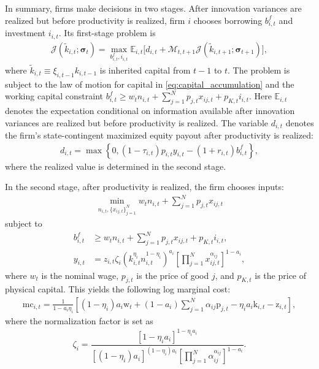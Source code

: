 \documentclass[12pt]{article}
\numberwithin{equation}{section}
\begin{document}
In summary, firms make decisions in two stages. After innovation variances are realized but before productivity is realized, firm $i$ chooses borrowing $b^f_{i,t}$ and investment $i_{i,t}$. Its first-stage problem is
\begin{align}\label{eq:firm_first_stage_decision}
    \mathcal{J}
    \left(\tilde{k}_{i,t}; \boldsymbol\sigma_t\right)
    =
    \max_{b^f_{i,t}, i_{i,t}}
    \mathbb{E}_{i,t}
    \Bigg[
            d_{i,t}
            +
            \mathcal{M}_{t,t+1}
            \mathcal{J}\left(\tilde{k}_{i,t+1}; \boldsymbol\sigma_{t+1}\right)
    \Bigg],
\end{align}
where $\tilde{k}_{i,t} \equiv \xi_{i,t-1}k_{i,t-1}$ is inherited capital from $t-1$ to $t$. The problem is subject to the law of motion for capital in \eqref{eq:capital_accumulation} and the working capital constraint $b^f_{i,t} \geq w_t n_{i,t} + \sum_{j=1}^{N} p_{j,t} x_{ij,t} + p_{K,t} i_{i,t}$. Here $\mathbb{E}_{i,t}$ denotes the expectation conditional on information available after innovation variances are realized but before productivity is realized. The variable $d_{i,t}$ denotes the firm's state-contingent maximized equity payout after productivity is realized:
\begin{align*}
    d_{i,t}
    =
    \max\left\{
        0,
        (1-\tau_{i,t})p_{i,t} y_{i,t}
        -
        (1+r_{i,t})b^f_{i,t}
    \right\},
\end{align*}
where the realized value is determined in the second stage.

In the second stage, after productivity is realized, the firm chooses inputs:
\begin{align}\label{eq:firm_second_stage_decision}
    \min_{n_{i,t},\{x_{ij,t}\}_{j=1}^{N}}
    w_t n_{i,t}
    + \sum_{j=1}^{N} p_{j,t} x_{ij,t}
\end{align}
subject to
\begin{align*}
    b^f_{i,t} &\geq w_t n_{i,t}
    + \sum_{j=1}^{N} p_{j,t} x_{ij,t}
    + p_{K,t} i_{i,t},
    \\
    y_{i,t}
    &=
    z_{i,t}\zeta_i
    \left(
        k_{i,t}^{\eta_i}n_{i,t}^{1-\eta_i}
    \right)^{a_i}
    \left[
        \prod_{j=1}^{N}
        x_{ij,t}^{\alpha_{ij}}
    \right]^{1-a_i},
\end{align*}
where $w_t$ is the nominal wage, $p_{j,t}$ is the price of good $j$, and $p_{K,t}$ is the price of physical capital. This yields the following log marginal cost:
\begin{align}\label{eq:marginal_cost}
    \text{mc}_{i,t} = \frac{1}{1-a_i\eta_i} \left[(1-\eta_i)a_i \text{w}_t + (1-a_i)\sum_{j=1}^N \alpha_{ij} \text{p}_{j,t} - \eta_i a_i \text{k}_{i,t} - \text{z}_{i,t}\right],
\end{align}
where the normalization factor is set as
\begin{align*}
    \zeta_i = \dfrac{[1-\eta_i a_i]^{1-\eta_i a_i}}{[(1-\eta_i)a_i]^{(1-\eta_i)a_i}\left[\prod_{j=1}^N \alpha_{ij}^{\alpha_{ij}}\right]^{1-a_i}}.
\end{align*}
\end{document}
